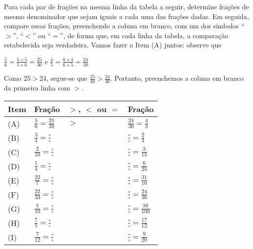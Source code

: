 \documentclass[a4,12pt]{book}
\begin{document}
Para cada par de frações na mesma linha da tabela a seguir, determine frações de mesmo denominador que sejam iguais a cada uma das frações dadas. Em seguida, compare essas frações, preenchendo a coluna em branco, com um dos símbolos ``$>$'', ``$<$'' ou ``$=$'', de forma que, em cada linha da tabela, a comparação estabelecida seja verdadeira. Vamos fazer o Item (A) juntos: observe que

$\frac{5}{6} = \frac{5 \times 5}{5 \times 6} = \frac{25}{30}$ e $\frac{4}{5} = \frac{6 \times 4}{6 \times 5} = \frac{24}{30}$

Como $25 > 24$, segue-se que $\frac{25}{30} > \frac{24}{30}$. Portanto, preenchemos a coluna em branco da primeira linha com $>$.


\begin{center}
  \begin{longtable}{m{}|m{}|m{}|m{}|}
    \hline \hline
     Item &  Fração &  $>$, $<$ ou $=$ &  Fração \\
    \hline
     (A) &  $\frac{5}{6} = \frac{25}{30}$ &   $>$  &  $\frac{24}{30} = \frac{4}{5}$ \\
    \hline
     (B) &  $\frac{3}{4} = \frac{\square}{\square}$ &   &  $\frac{\square}{\square} = \frac{2}{3}$ \\
    \hline
     (C) &  $\frac{2}{10} = \frac{\square}{\square}$ &   &  $\frac{\square}{\square} = \frac{3}{15}$ \\
    \hline
     (D) &  $\frac{1}{4} = \frac{\square}{\square}$ &   &  $\frac{\square}{\square} = \frac{6}{25}$ \\
    \hline
     (E) &  $\frac{22}{7} = \frac{\square}{\square}$ &  &  $\frac{\square}{\square} = \frac{31}{10}$ \\
    \hline
     (F) &  $\frac{22}{33} = \frac{\square}{\square}$ &   &  $\frac{\square}{\square} = \frac{24}{36}$ \\
    \hline
     (G) &  $\frac{5}{10} = \frac{\square}{\square}$ &   &  $\frac{\square}{\square} = \frac{50}{100}$ \\
    \hline
     (H) &  $\frac{7}{5} = \frac{\square}{\square}$ &  &  $\frac{\square}{\square} = \frac{17}{12}$ \\
    \hline
     (I) &  $\frac{7}{12} = \frac{\square}{\square}$ &  &  $\frac{\square}{\square} = \frac{9}{20}$ \\
    \hline
  \end{longtable}
\end{center}
\end{document}

